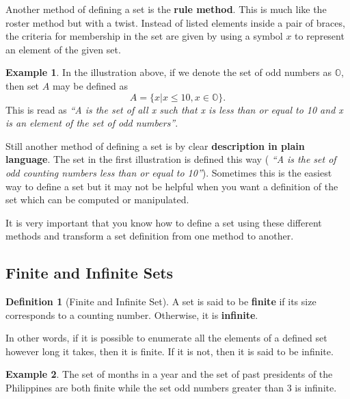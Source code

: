 \documentclass[]{book}
\theoremstyle{definition}
\newtheorem{definition}{Definition}[chapter]
\theoremstyle{definition}
\newtheorem{example}{Example}[chapter]
\theoremstyle{definition}
\theoremstyle{remark}
\begin{document}
Another method of defining a set is the \textbf{rule method}. This is much like the roster method but with a twist. Instead of listed elements inside a pair of braces, the criteria for membership in the set are given by using a symbol \(x\) to represent an element of the given set.

\begin{example}
\protect\hypertarget{exm:unnamed-chunk-3}{}{\label{exm:unnamed-chunk-3} } In the illustration above, if we denote the set of odd numbers as \(\mathbb{O}\), then set \(A\) may be defined as \[A = \{x | x \leq 10, x \in \mathbb{O}\}.\]
This is read as \emph{``A is the set of all x such that x is less than or equal to 10 and x is an element of the set of odd numbers''}.
\end{example}

Still another method of defining a set is by clear \textbf{description in plain language}. The set in the first illustration is defined this way ( \emph{``A is the set of odd counting numbers less than or equal to 10''}). Sometimes this is the easiest way to define a set but it may not be helpful when you want a definition of the set which can be computed or manipulated.

It is very important that you know how to define a set using these different methods and transform a set definition from one method to another.

\hypertarget{finite-and-infinite-sets}{%
\subsection*{Finite and Infinite Sets}\label{finite-and-infinite-sets}}

\begin{definition}[Finite and Infinite Set]
\protect\hypertarget{def:unnamed-chunk-4}{}{\label{def:unnamed-chunk-4} \iffalse (Finite and Infinite Set) \fi{} }A set is said to be \textbf{finite} if its size corresponds to a counting number. Otherwise, it is \textbf{infinite}.
\end{definition}

In other words, if it is possible to enumerate all the elements of a defined set however long it takes, then it is finite. If it is not, then it is said to be infinite.

\begin{example}
\protect\hypertarget{exm:unnamed-chunk-5}{}{\label{exm:unnamed-chunk-5} }The set of months in a year and the set of past presidents of the Philippines are both finite while the set odd numbers greater than 3 is infinite.
\end{example}
\end{document}
